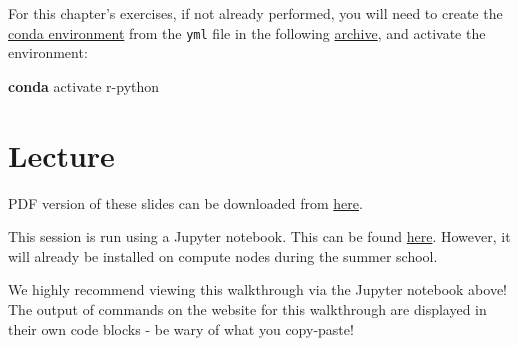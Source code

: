 \documentclass[
  letterpaper,
]{book}
\newenvironment{Shaded}{}{}
\newcommand{\ExtensionTok}[1]{\textcolor[rgb]{0.84,0.23,0.29}{\textbf{#1}}}
\newcommand{\NormalTok}[1]{\textcolor[rgb]{0.14,0.16,0.18}{#1}}
\begin{document}
\begin{tcolorbox}[enhanced jigsaw, opacitybacktitle=0.6, bottomtitle=1mm, opacityback=0, colback=white, coltitle=black, leftrule=.75mm, toprule=.15mm, title=\textcolor{quarto-callout-tip-color}{\faLightbulb}\hspace{0.5em}{Tip}, colframe=quarto-callout-tip-color-frame, toptitle=1mm, arc=.35mm, left=2mm, titlerule=0mm, breakable, rightrule=.15mm, bottomrule=.15mm, colbacktitle=quarto-callout-tip-color!10!white]

For this chapter's exercises, if not already performed, you will need to
create the \protect\hyperlink{creating-a-conda-environment}{conda
environment} from the \texttt{yml} file in the following
\href{https://doi.org/10.5281/zenodo.6983159}{archive}, and activate the
environment:

\begin{Shaded}
\begin{Highlighting}[]
\ExtensionTok{conda}\NormalTok{ activate r{-}python}
\end{Highlighting}
\end{Shaded}

\end{tcolorbox}

\hypertarget{lecture-7}{%
\section{Lecture}\label{lecture-7}}

PDF version of these slides can be downloaded from
\href{https://github.com/SPAAM-community/wss-summer-school/raw/main/docs/assets/slides/2022/3b2-python-pandas/SPAAM\%20Summer\%20School\%202022\%20-\%203B2\%20-\%20Intro\%20to\%20Python\%20and\%20Pandas.pdf}{here}.

This session is run using a Jupyter notebook. This can be found
\href{https://github.com/maxibor/intro-to-pandas-plotnine}{here}.
However, it will already be installed on compute nodes during the summer
school.

\begin{tcolorbox}[enhanced jigsaw, opacitybacktitle=0.6, bottomtitle=1mm, opacityback=0, colback=white, coltitle=black, leftrule=.75mm, toprule=.15mm, title=\textcolor{quarto-callout-warning-color}{\faExclamationTriangle}\hspace{0.5em}{Warning}, colframe=quarto-callout-warning-color-frame, toptitle=1mm, arc=.35mm, left=2mm, titlerule=0mm, breakable, rightrule=.15mm, bottomrule=.15mm, colbacktitle=quarto-callout-warning-color!10!white]

We highly recommend viewing this walkthrough via the Jupyter notebook
above! The output of commands on the website for this walkthrough are
displayed in their own code blocks - be wary of what you copy-paste!

\end{tcolorbox}
\end{document}
